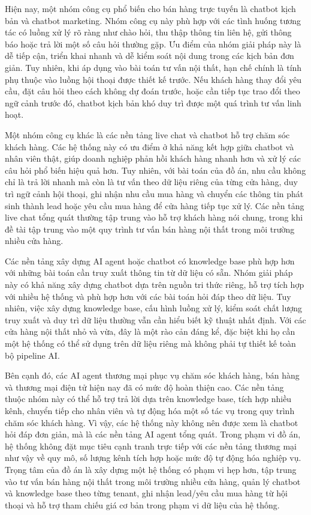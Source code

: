 \documentclass[../DoAn.tex]{subfiles}
\begin{document}
Hiện nay, một nhóm công cụ phổ biến cho bán hàng trực tuyến là chatbot kịch bản và chatbot marketing. Nhóm công cụ này phù hợp với các tình huống tương tác có luồng xử lý rõ ràng như chào hỏi, thu thập thông tin liên hệ, gửi thông báo hoặc trả lời một số câu hỏi thường gặp. Ưu điểm của nhóm giải pháp này là dễ tiếp cận, triển khai nhanh và dễ kiểm soát nội dung trong các kịch bản đơn giản. Tuy nhiên, khi áp dụng vào bài toán tư vấn nội thất, hạn chế chính là tính phụ thuộc vào luồng hội thoại được thiết kế trước. Nếu khách hàng thay đổi yêu cầu, đặt câu hỏi theo cách không dự đoán trước, hoặc cần tiếp tục trao đổi theo ngữ cảnh trước đó, chatbot kịch bản khó duy trì được một quá trình tư vấn linh hoạt.

Một nhóm công cụ khác là các nền tảng live chat và chatbot hỗ trợ chăm sóc khách hàng. Các hệ thống này có ưu điểm ở khả năng kết hợp giữa chatbot và nhân viên thật, giúp doanh nghiệp phản hồi khách hàng nhanh hơn và xử lý các câu hỏi phổ biến hiệu quả hơn. Tuy nhiên, với bài toán của đồ án, nhu cầu không chỉ là trả lời nhanh mà còn là tư vấn theo dữ liệu riêng của từng cửa hàng, duy trì ngữ cảnh hội thoại, ghi nhận nhu cầu mua hàng và chuyển các thông tin phát sinh thành lead hoặc yêu cầu mua hàng để cửa hàng tiếp tục xử lý. Các nền tảng live chat tổng quát thường tập trung vào hỗ trợ khách hàng nói chung, trong khi đề tài tập trung vào một quy trình tư vấn bán hàng nội thất trong môi trường nhiều cửa hàng.

Các nền tảng xây dựng AI agent hoặc chatbot có knowledge base phù hợp hơn với những bài toán cần truy xuất thông tin từ dữ liệu có sẵn. Nhóm giải pháp này có khả năng xây dựng chatbot dựa trên nguồn tri thức riêng, hỗ trợ tích hợp với nhiều hệ thống và phù hợp hơn với các bài toán hỏi đáp theo dữ liệu. Tuy nhiên, việc xây dựng knowledge base, cấu hình luồng xử lý, kiểm soát chất lượng truy xuất và duy trì dữ liệu thường vẫn cần hiểu biết kỹ thuật nhất định. Với các cửa hàng nội thất nhỏ và vừa, đây là một rào cản đáng kể, đặc biệt khi họ cần một hệ thống có thể sử dụng trên dữ liệu riêng mà không phải tự thiết kế toàn bộ pipeline AI.

Bên cạnh đó, các AI agent thương mại phục vụ chăm sóc khách hàng, bán hàng và thương mại điện tử hiện nay đã có mức độ hoàn thiện cao. Các nền tảng thuộc nhóm này có thể hỗ trợ trả lời dựa trên knowledge base, tích hợp nhiều kênh, chuyển tiếp cho nhân viên và tự động hóa một số tác vụ trong quy trình chăm sóc khách hàng. Vì vậy, các hệ thống này không nên được xem là chatbot hỏi đáp đơn giản, mà là các nền tảng AI agent tổng quát. Trong phạm vi đồ án, hệ thống không đặt mục tiêu cạnh tranh trực tiếp với các nền tảng thương mại như vậy về quy mô, số lượng kênh tích hợp hoặc mức độ tự động hóa nghiệp vụ. Trọng tâm của đồ án là xây dựng một hệ thống có phạm vi hẹp hơn, tập trung vào tư vấn bán hàng nội thất trong môi trường nhiều cửa hàng, quản lý chatbot và knowledge base theo từng tenant, ghi nhận lead/yêu cầu mua hàng từ hội thoại và hỗ trợ tham chiếu giá cơ bản trong phạm vi dữ liệu của hệ thống.
\end{document}

